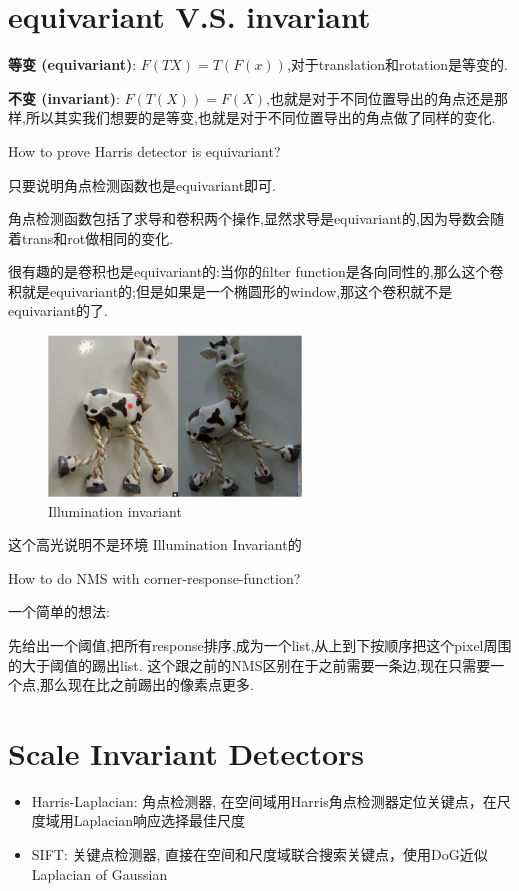 \section{equivariant V.S. invariant}
\begin{definition}
    

\textbf{等变 (equivariant)}: $F(TX)=T(F(x))$,对于translation和rotation是等变的.

\textbf{不变 (invariant)}: $F(T(X))=F(X)$,也就是对于不同位置导出的角点还是那样,所以其实我们想要的是等变,也就是对于不同位置导出的角点做了同样的变化.
\end{definition}

\begin{problem}
    How to prove Harris detector is equivariant?
\end{problem}


只要说明角点检测函数也是equivariant即可.

角点检测函数包括了求导和卷积两个操作,显然求导是equivariant的,因为导数会随着trans和rot做相同的变化.

很有趣的是卷积也是equivariant的:当你的filter function是各向同性的,那么这个卷积就是equivariant的;但是如果是一个椭圆形的window,那这个卷积就不是equivariant的了.

\begin{figure}[htbp]
    \centering
    \includegraphics[width=0.6\textwidth]{figures/light_invariant.png}
    \caption{Illumination invariant}
\end{figure}
\begin{remark}
    这个高光说明不是环境 Illumination Invariant的
\end{remark}


\begin{problem}
    How to do NMS with corner-response-function?
\end{problem}


一个简单的想法:

先给出一个阈值,把所有response排序,成为一个list,从上到下按顺序把这个pixel周围的大于阈值的踢出list.
这个跟之前的NMS区别在于之前需要一条边,现在只需要一个点,那么现在比之前踢出的像素点更多.

\section{Scale Invariant Detectors}
\begin{itemize}
    \item Harris-Laplacian: 角点检测器, 在空间域用Harris角点检测器定位关键点，在尺度域用Laplacian响应选择最佳尺度
    \item SIFT: 关键点检测器, 直接在空间和尺度域联合搜索关键点，使用DoG近似Laplacian of Gaussian
\end{itemize}
